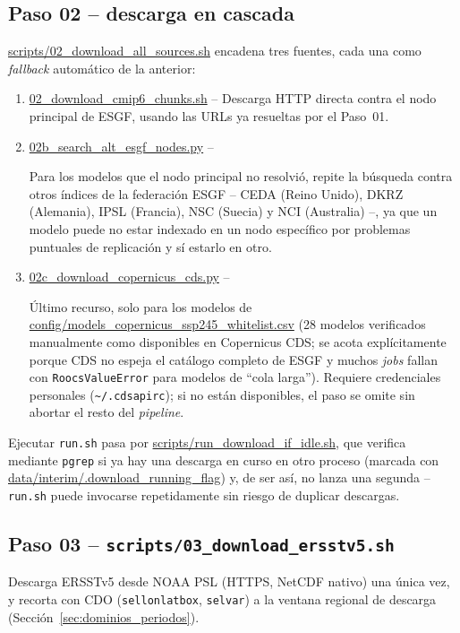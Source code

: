 \documentclass[11pt,a4paper]{article}
\newcommand{\archivo}[1]{\begingroup\hypersetup{urlcolor=black}\url{#1}\endgroup}
\begin{document}
\subsection{Paso 02 -- descarga en cascada}
\label{sec:paso02}
\archivo{scripts/02_download_all_sources.sh} encadena tres fuentes, cada una como \emph{fallback} autom\'atico de la anterior:
\begin{enumerate}[label=(\alph*)]
\item \archivo{02_download_cmip6_chunks.sh} -- 
Descarga HTTP directa contra el nodo principal de ESGF, usando las URLs ya resueltas por el Paso~01.
\item \archivo{02b_search_alt_esgf_nodes.py} -- 

Para los modelos que el nodo principal no resolvi\'o, repite la b\'usqueda contra otros \'indices de la federaci\'on ESGF -- CEDA (Reino Unido), DKRZ (Alemania), IPSL (Francia), NSC (Suecia) y NCI (Australia) --, ya que un modelo puede no estar indexado en un nodo espec\'ifico por problemas puntuales de replicaci\'on y s\'i estarlo en otro.
\item \archivo{02c_download_copernicus_cds.py} -- 

\'Ultimo recurso, solo para los modelos de \archivo{config/models_copernicus_ssp245_whitelist.csv} (28 modelos verificados manualmente como disponibles en Copernicus CDS; se acota expl\'icitamente porque CDS no espeja el cat\'alogo completo de ESGF y muchos \emph{jobs} fallan con \texttt{RoocsValueError} para modelos de ``cola larga''). Requiere credenciales personales (\texttt{\textasciitilde/.cdsapirc}); si no est\'an disponibles, el paso se omite sin abortar el resto del \emph{pipeline}.
\end{enumerate}
Ejecutar \texttt{run.sh} pasa por \archivo{scripts/run_download_if_idle.sh}, que verifica mediante \texttt{pgrep} si ya hay una descarga en curso en otro proceso (marcada con \archivo{data/interim/.download_running_flag}) y, de ser as\'i, no lanza una segunda -- \texttt{run.sh} puede invocarse repetidamente sin riesgo de duplicar descargas.

\subsection{Paso 03 -- \texttt{scripts/03\_download\_ersstv5.sh}}
Descarga ERSSTv5 desde NOAA PSL (HTTPS, NetCDF nativo) una \'unica vez, y recorta con CDO (\texttt{sellonlatbox}, \texttt{selvar}) a la ventana regional de descarga (Secci\'on~\ref{sec:dominios_periodos}).
\end{document}
